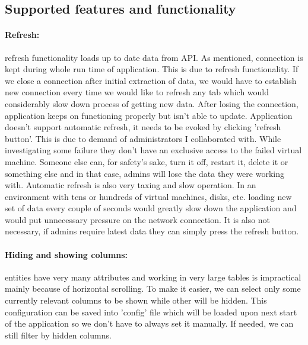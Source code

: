 \subsection{Supported features and functionality}
\paragraph{Refresh:}
refresh functionality loads up to date data from API. As mentioned, connection is kept during whole run time of application. This is due to refresh functionality. If we close a connection after initial extraction of data, we would have to establish new connection every time we would like to refresh any tab which would considerably slow down process of getting new data. After losing the connection, application keeps on functioning properly but isn't able to update. Application doesn't support automatic refresh, it needs to be evoked by clicking 'refresh button'. This is due to demand of administrators I collaborated with. While investigating some failure they don't have an exclusive access to the failed virtual machine. Someone else can, for safety's sake, turn it off, restart it, delete it or something else and in that case, admins will lose the data they were working with. Automatic refresh is also very taxing and slow operation. In an environment with tens or hundreds of virtual machines, disks, etc. loading new set of data every couple of seconds would greatly slow down the application and would put unnecessary pressure on the network connection. It is also not necessary, if admins require latest data they can simply press the refresh button.

\paragraph{Hiding and showing columns:}
entities have very many attributes and working in very large tables is impractical mainly because of horizontal scrolling. To make it easier, we can select only some currently relevant columns to be shown while other will be hidden. This configuration can be saved into 'config' file which will be loaded upon next start of the application so we don't have to always set it manually. If needed, we can still filter by hidden columns.

